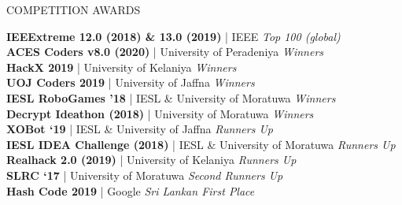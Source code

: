 \documentclass{cv}
\begin{document}

\begin{rSection}{COMPETITION AWARDS}{
    {\textbf{IEEExtreme 12.0 (2018) \& 13.0 (2019)} | IEEE}                     \hfill {\em Top 100 (global)}\\
    {\textbf{ACES Coders v8.0 (2020)} | University of Peradeniya}               \hfill {\em Winners}\\
    {\textbf{HackX 2019} | University of Kelaniya}                              \hfill {\em Winners}\\
    {\textbf{UOJ Coders 2019} | University of Jaffna}                           \hfill {\em Winners}\\
    {\textbf{IESL RoboGames '18} | IESL \& University of Moratuwa}              \hfill {\em Winners}\\
    {\textbf{Decrypt Ideathon (2018)} | University of Moratuwa}                 \hfill {\em Winners}\\
    {\textbf{XOBot `19} | IESL \& University of Jaffna}                          \hfill {\em Runners Up}\\
    {\textbf{IESL IDEA Challenge (2018)} | IESL \& University of Moratuwa}      \hfill {\em Runners Up}\\
    {\textbf{Realhack 2.0 (2019)} | University of Kelaniya}                     \hfill {\em Runners Up}\\
    {\textbf{SLRC `17} | University of Moratuwa}                                 \hfill {\em Second Runners Up}\\
    {\textbf{Hash Code 2019} | Google}                                           \hfill {\em Sri Lankan First Place}\par
    }\end{rSection}
\newpage

\end{document}
